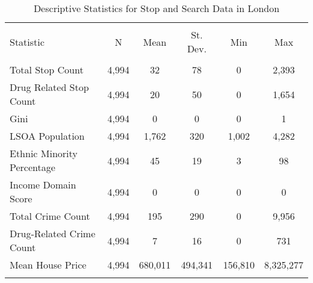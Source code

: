 
\begin{table}[!htbp] \centering 
  \caption{Descriptive Statistics for Stop and Search Data in London} 
  \label{tab:descriptive_london} 
\begin{tabular}{@{\extracolsep{5pt}}lccccc} 
\\[-1.8ex]\hline 
\hline \\[-1.8ex] 
Statistic & \multicolumn{1}{c}{N} & \multicolumn{1}{c}{Mean} & \multicolumn{1}{c}{St. Dev.} & \multicolumn{1}{c}{Min} & \multicolumn{1}{c}{Max} \\ 
\hline \\[-1.8ex] 
Total Stop Count & 4,994 & 32 & 78 & 0 & 2,393 \\ 
Drug Related Stop Count & 4,994 & 20 & 50 & 0 & 1,654 \\ 
Gini & 4,994 & 0 & 0 & 0 & 1 \\ 
LSOA Population & 4,994 & 1,762 & 320 & 1,002 & 4,282 \\ 
Ethnic Minority Percentage & 4,994 & 45 & 19 & 3 & 98 \\ 
Income Domain Score & 4,994 & 0 & 0 & 0 & 0 \\ 
Total Crime Count & 4,994 & 195 & 290 & 0 & 9,956 \\ 
Drug-Related Crime Count & 4,994 & 7 & 16 & 0 & 731 \\ 
Mean House Price & 4,994 & 680,011 & 494,341 & 156,810 & 8,325,277 \\ 
\hline \\[-1.8ex] 
\end{tabular} 
\end{table} 

